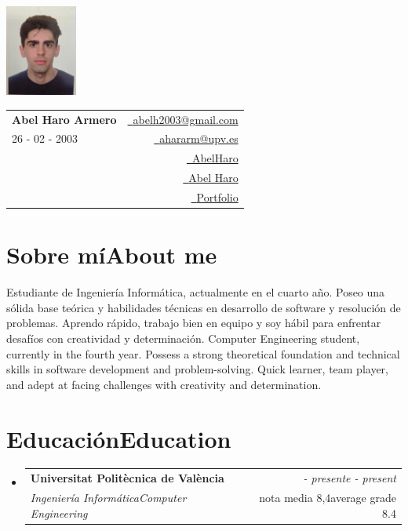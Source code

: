 \documentclass[11pt,a4paper]{article}
\makeatletter
\newcommand{\resumeSubheading}[4]{
\vspace{0.5mm}\item
    \begin{tabular*}{0.98\textwidth}[t]{l@{\extracolsep{\fill}}r}
        \textbf{#1} & \textit{\footnotesize{#4}} \\
        \textit{\footnotesize{#3}} &  \footnotesize{#2}\\
    \end{tabular*}
    \vspace{-2.4mm}
}
\newcommand{\resumeSubHeadingListStart}{\begin{itemize}[leftmargin=*,labelsep=0mm]}
\newcommand{\resumeSubHeadingListEnd}{\end{itemize}\vspace{2mm}}
\newcommand{\name}{Abel Haro Armero}
\newcommand{\emaila}{abelh2003@gmail.com}
\newcommand{\emailb}{ahararm@upv.es}
\newcommand{\cvdate}{26 - 02 - 2003}
\makeatother
\begin{document}
\selectfont

\parbox{2.6cm}{%
\includegraphics[width=2.35cm,clip]{CV_foto.jpeg}
}
\parbox{\dimexpr\linewidth-2.9cm\relax}{
\begin{tabularx}{\linewidth}{L r}
  \textbf{\Large \name} & \href{mailto:\emaila}{\raisebox{0.0\height}{\footnotesize \faEnvelope}\ {\emaila}} \\
  \cvdate & \href{mailto:\emailb}{\raisebox{0.0\height}{\footnotesize \faEnvelope}\ {\emailb}} \\
  {} & \href{https://github.com/AbelHaro}{\raisebox{0.0\height}{\footnotesize \faGithub}\ {AbelHaro}} \\
  {} & \href{https://www.linkedin.com/in/abel-haro-54bb6518a}{\raisebox{0.0\height}{\footnotesize \faLinkedin}\ {Abel Haro}} \\
  {} & \href{https://porfolio-red-sigma.vercel.app/}{\raisebox{0.0\height}{\footnotesize \faGlobe}\ {Portfolio}} \\

\end{tabularx}
}

\section{\textbf{\ifdefined\spanish Sobre mí\else About me\fi}}
\vspace{0.1cm}
\ifdefined\spanish
  Estudiante de Ingeniería Informática, actualmente en el cuarto año. Poseo una sólida base teórica
y habilidades técnicas en desarrollo de software y resolución de
problemas. Aprendo rápido, trabajo bien en equipo y soy hábil para enfrentar
desafíos con creatividad y determinación.
\else
  Computer Engineering student, currently in the fourth year. Possess a strong theoretical foundation
and technical skills in software development and problem-solving. Quick learner, 
team player, and adept at facing challenges with creativity and determination.
\fi
\vspace{-5.5mm}
\vspace{0.3cm}

\section{\textbf{\ifdefined\spanish Educación\else Education\fi}}
  \resumeSubHeadingListStart
    \resumeSubheading
      {Universitat Politècnica de València}{\ifdefined\spanish nota media 8,4\else average grade 8.4\fi}
      {\ifdefined\spanish Ingeniería Informática\else Computer Engineering\fi}
      {\ifdefined\spanish 2021 - presente\else 2021 - present\fi}
  \resumeSubHeadingListEnd
\vspace{-5.5mm}
\end{document}
